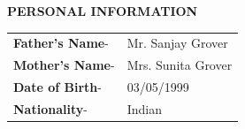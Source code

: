 \documentclass[10pt]{article}
\begin{document}
\vspace{5mm}
\begin{huge}
\textbf{\color{theme}PERSONAL INFORMATION}
\end{huge}
\begin{mdframed}[backgroundcolor=theme]
\end{mdframed}

\vspace{1mm}
\begin{flushleft}
\begin{tabular}{l l}\raggedleft

\color{black}\textbf{Father's Name}-& \color{black}Mr. Sanjay Grover \\ 
\textbf{Mother's Name}-& Mrs. Sunita Grover\\
\textbf{Date of Birth}-& 03/05/1999\\
\textbf{Nationality}-& Indian\\

\end{tabular}
\end{flushleft}

\vspace{2mm}
\end{document}
